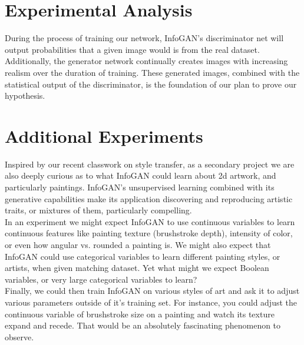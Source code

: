 \documentclass{article}
\begin{document}
\section{Experimental Analysis}
During the process of training our network, InfoGAN's discriminator net will output probabilities that a given image would is from the real dataset.  Additionally, the generator network continually creates images with increasing realism over the duration of training.  These generated images, combined with the statistical output of the discriminator, is the foundation of our plan to prove our hypothesis.  

\section{Additional Experiments}
Inspired by our recent classwork on style transfer, as a secondary project we are also deeply curious as to what InfoGAN could learn about 2d artwork, and particularly paintings.  InfoGAN's unsupervised learning combined with its generative capabilities make its application discovering and reproducing artistic traits, or mixtures of them, particularly compelling. \\  

In an experiment we might expect InfoGAN to use continuous variables to learn continuous features like painting texture (brushstroke depth), intensity of color, or even how angular vs. rounded a painting is.  We might also expect that InfoGAN could use categorical variables to learn different painting styles, or artists, when given matching dataset.  Yet what might we expect Boolean variables, or very large categorical variables to learn? \\

Finally, we could then train InfoGAN on various styles of art and ask it to adjust various parameters outside of it's training set.  For instance, you could adjust the continuous variable of brushstroke size on a painting and watch its texture expand and recede. That would be an absolutely fascinating phenomenon to observe. 

\nocite{*}


\end{document}
